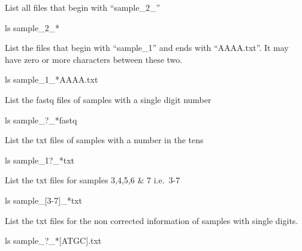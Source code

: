 \documentclass[
  letterpaper,
  DIV=11,
  numbers=noendperiod]{scrreprt}
\newenvironment{Shaded}{\begin{snugshade}}{\end{snugshade}}
\newcommand{\FunctionTok}[1]{\textcolor[rgb]{0.28,0.35,0.67}{#1}}
\newcommand{\NormalTok}[1]{\textcolor[rgb]{0.00,0.23,0.31}{#1}}
\newcommand{\PreprocessorTok}[1]{\textcolor[rgb]{0.68,0.00,0.00}{#1}}
\newcommand{\SpecialStringTok}[1]{\textcolor[rgb]{0.13,0.47,0.30}{#1}}
\begin{document}
List all files that begin with ``sample\_2\_''

\begin{Shaded}
\begin{Highlighting}[]
\FunctionTok{ls}\NormalTok{ sample\_2\_}\PreprocessorTok{*}
\end{Highlighting}
\end{Shaded}

List the files that begin with ``sample\_1'' and ends with ``AAAA.txt''.
It may have zero or more characters between these two.

\begin{Shaded}
\begin{Highlighting}[]
\FunctionTok{ls}\NormalTok{ sample\_1\_}\PreprocessorTok{*}\NormalTok{AAAA.txt}
\end{Highlighting}
\end{Shaded}

List the fastq files of samples with a single digit number

\begin{Shaded}
\begin{Highlighting}[]
\FunctionTok{ls}\NormalTok{ sample\_}\PreprocessorTok{?}\NormalTok{\_}\PreprocessorTok{*}\NormalTok{fastq}
\end{Highlighting}
\end{Shaded}

List the txt files of samples with a number in the tens

\begin{Shaded}
\begin{Highlighting}[]
\FunctionTok{ls}\NormalTok{ sample\_1}\PreprocessorTok{?}\NormalTok{\_}\PreprocessorTok{*}\NormalTok{txt}
\end{Highlighting}
\end{Shaded}

List the txt files for samples 3,4,5,6 \& 7 i.e.~3-7

\begin{Shaded}
\begin{Highlighting}[]
\FunctionTok{ls}\NormalTok{ sample\_}\PreprocessorTok{[}\SpecialStringTok{3}\PreprocessorTok{{-}}\SpecialStringTok{7}\PreprocessorTok{]}\NormalTok{\_}\PreprocessorTok{*}\NormalTok{txt}
\end{Highlighting}
\end{Shaded}

List the txt files for the non corrected information of samples with
single digits.

\begin{Shaded}
\begin{Highlighting}[]
\FunctionTok{ls}\NormalTok{ sample\_}\PreprocessorTok{?}\NormalTok{\_}\PreprocessorTok{*[}\SpecialStringTok{ATGC}\PreprocessorTok{]}\NormalTok{.txt}
\end{Highlighting}
\end{Shaded}
\end{document}
